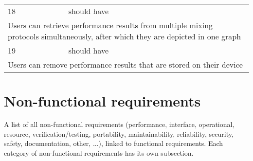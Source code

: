 \begin{center}
\begin{tabular}{ p{} p{}}
18 & should have \\
\multicolumn{2}{p{\textwidth}}{Users can retrieve performance results from multiple mixing protocols simultaneously, after which they are depicted in one graph} \\
\hline

19 & should have \\
\multicolumn{2}{p{\textwidth}}{Users can remove performance results that are stored on their device} \\
\hline

\end{tabular}
\end{center}

\section{Non-functional requirements}
A list of all non-functional requirements (performance, interface, operational, resource, verification/testing, portability, maintainability, reliability, security, safety, documentation, other, ...), linked to functional requirements. Each category of non-functional requirements has its own subsection.


